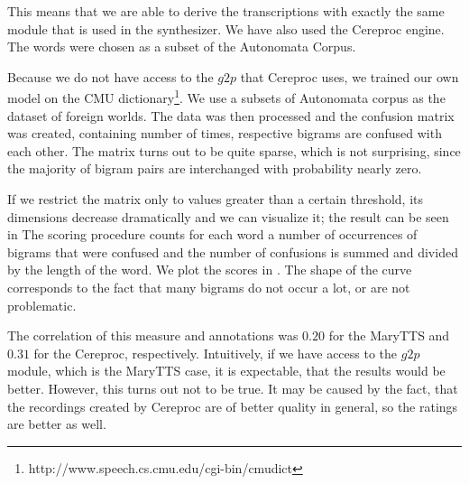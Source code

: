 This means that we are able to derive the transcriptions with exactly the same module that is used in the synthesizer.
We have also used the Cereproc engine.
The words were chosen as a subset of the Autonomata Corpus.
\par
Because we do not have access to the $g2p$ that Cereproc uses, we trained our own model on the CMU dictionary\footnote{http://www.speech.cs.cmu.edu/cgi-bin/cmudict}.
We use a subsets of Autonomata corpus as the dataset of foreign worlds.
The data was then processed and the confusion matrix was created, containing number of times, respective bigrams are confused with each other.
The matrix turns out to be quite sparse, which is not surprising, since the majority of bigram pairs are interchanged with probability nearly zero.
\par
If we restrict the matrix only to values greater than a certain threshold, its dimensions decrease dramatically and we can visualize it; the result can be seen in 
The scoring procedure counts for each word a number of occurrences of bigrams that were confused and the number of confusions is summed and divided by the length of the word.
We plot the scores in .
The shape of the curve corresponds to the fact that many bigrams do not occur a lot, or are not problematic.
\par
The correlation of this measure and annotations was $0.20$ for the MaryTTS and $0.31$ for the Cereproc, respectively.
Intuitively, if we have access to the $g2p$ module, which is the MaryTTS case, it is expectable, that the results would be better.
However, this turns out not to be true.
It may be caused by the fact, that the recordings created by Cereproc are of better quality in general, so the ratings are better as well.
